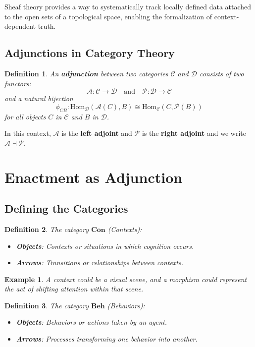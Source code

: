\documentclass{article}
\newtheorem{definition}{Definition}[section]
\newtheorem{example}{Example}[section]
\begin{document}
Sheaf theory provides a way to systematically track locally defined data attached to the open sets of a topological space, enabling the formalization of context-dependent truth.

\subsection{Adjunctions in Category Theory}

\begin{definition}
An \textbf{adjunction} between two categories $\mathcal{C}$ and $\mathcal{D}$ consists of two functors:
\[
\mathcal{A} \colon \mathcal{C} \to \mathcal{D} \quad \text{and} \quad \mathcal{P} \colon \mathcal{D} \to \mathcal{C}
\]
and a natural bijection
\[
\phi_{CB} \colon \text{Hom}_{\mathcal{D}} ( \mathcal{A}(C), B ) \cong \text{Hom}_{\mathcal{C}} (C, \mathcal{P}(B))
\]
for all objects $C$ in $\mathcal{C}$ and $B$ in $\mathcal{D}$.
\end{definition}

In this context, $\mathcal{A}$ is the \textbf{left adjoint} and $\mathcal{P}$ is the \textbf{right adjoint} and we write $\mathcal{A} \dashv \mathcal{P}$.

\section{Enactment as Adjunction}

\subsection{Defining the Categories}

\begin{definition} The category $\mathbf{Con}$ (Contexts):

\begin{itemize} 
\item \textbf{Objects}: Contexts or situations in which cognition occurs. 
\item \textbf{Arrows}: Transitions or relationships between contexts. 
\end{itemize} 
\end{definition}

\begin{example} A context could be a visual scene, and a morphism could represent the act of shifting attention within that scene. \end{example}

\begin{definition} The category $\mathbf{Beh}$ (Behaviors):

\begin{itemize} 
\item \textbf{Objects}: Behaviors or actions taken by an agent. 
\item \textbf{Arrows}: Processes transforming one behavior into another. 
\end{itemize} 
\end{definition}
\end{document}
